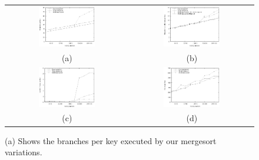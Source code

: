 \documentclass[acmtocl]{acmtrans2m}
\begin{document}
\begin{figure}
\centering
\begin{tabular}{cc}
\includegraphics[width=0.48\textwidth]{plots/mergesort_branches_per_key.eps} & \includegraphics[width=0.48\textwidth]{plots/mergesort_branch_misses.eps} \\
(a) & (b) \\
\includegraphics[width=0.48\textwidth]{plots/mergesort_level_2_misses.eps} & \includegraphics[width=0.48\textwidth]{plots/mergesort_cycle_counts.eps} \\
(c) & (d) \\
\end{tabular}
\caption{(a) Shows the branches per key executed by our mergesort variations.
}
\end{figure}
\end{document}
